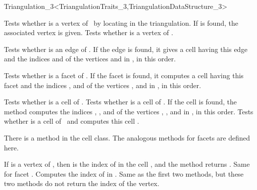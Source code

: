 \begin{ccRefClass}{Triangulation_3<TriangulationTraits_3,TriangulationDataStructure_3>}

{Tests whether  is a vertex of \ccVar\ by locating  in
the triangulation. If  is found, the associated vertex 
is given.}
\ccGlue
{}
{Tests whether  is a vertex of \ccVar.}

{Tests whether  is an edge of \ccVar. If the edge is found,
it gives a cell  having this edge and the indices 
and  of the vertices  and  in , in this order.  
}

{Tests whether  is a facet of \ccVar. If the facet is found,
it computes a cell  having this facet and the indices ,
 and  of the vertices ,  and  in , 
in this order.  
}

{Tests whether  is a cell of \ccVar.}
\ccGlue
{}
{Tests whether  is a cell of \ccVar. 
If the cell  is found, the method
computes the indices , ,  and  of the
vertices , ,  and  in , in this
order. 
}
\ccGlue
{}
{Tests whether  is a cell of \ccVar\ and computes 
this cell .
}

There is a method  in the cell class. The analogous
methods for facets are defined here.

{If  is a vertex of , then  is the index of
 in the cell , and the method returns .
}
\ccGlue
{}
{Same for facet . Computes the index  of  in
.}
\ccGlue
{}
{}
\ccGlue
{}
{Same as the first two methods, but these two methods do not return the
index of the vertex.}


\end{ccRefClass}
